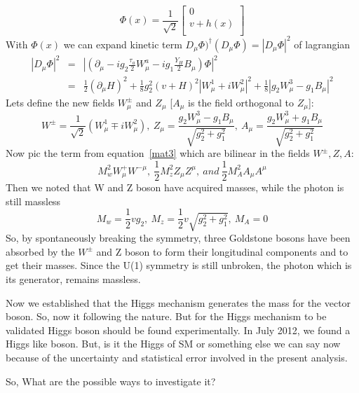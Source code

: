 \begin{equation}
    \Phi (x)=\frac{1}{\sqrt{2}}
        \begin{bmatrix}
        0   \\
        v+h(x)  \\
        \end{bmatrix}
\end{equation}
With $\Phi(x)$ we can expand kinetic term $D_\mu \Phi)^{\dagger} (D_\mu \Phi)=|D_\mu \Phi|^2$ of lagrangian
\begin{eqnarray}\label{mat3}
    |D_{\mu} \Phi|^2 & = & |(\partial_{\mu}-ig_2\frac{\tau_a}{2}W^a_{\mu}-ig_1 \frac{Y_H}{2}B_{\mu})\Phi|^2 \nonumber \\
            & = & \frac{1}{2}(\partial_\mu H)^2+\frac{1}{8}g^2_2(v+H)^2|W^1_{\mu}+iW^2_\mu|^2+\frac{1}{8}|g_2W^3_\mu-g_1B_\mu|^2
\end{eqnarray}
Lets define the new fields $W^{\pm}_\mu$ and $Z_\mu$ [$A_\mu$ is the field orthogonal to $Z_\mu$]:
\begin{equation}
    W^{\pm}=\frac{1}{\sqrt{2}}(W^1_\mu \mp iW^2_\mu),~Z_\mu=\frac{g_2W^3_\mu-g_1B_\mu}{\sqrt{g^2_2+g^2_1}},~A_\mu=\frac{g_2W^3_\mu+g_1B_\mu}{\sqrt{g^2_2+g^2_1}}
\end{equation}
Now pic the term from equation~\ref{mat3} which are bilinear in the fields $W^\pm,Z,A$:
\begin{equation}
    M^2_wW^+_\mu W^{-\mu},~\frac{1}{2}M^2_z Z_\mu Z^\mu,~and~\frac{1}{2}M^2_AA_\mu A^\mu
\end{equation}
Then we noted that W and Z boson have acquired masses, while the photon is still massless
\begin{equation}
    M_w=\frac{1}{2}vg_2,~M_z=\frac{1}{2}v\sqrt{g^2_2+g^2_1},~M_A=0
\end{equation}
So, by spontaneously breaking the symmetry, three Goldstone bosons have been absorbed by the $W^{\pm}$ and Z boson to form their longitudinal components and to get their masses. Since the U(1) symmetry is still unbroken, the photon which is its generator, remains massless.

Now we established that the Higgs mechanism generates the mass for the vector boson. So, now it following the nature. But for the Higgs mechanism to be validated Higgs boson should be found experimentally. In July 2012, we found a Higgs like boson. But, is it the Higgs of SM or something else we can say now because of the uncertainty and statistical error involved in the present analysis. 

So, What are the possible ways to investigate it?

